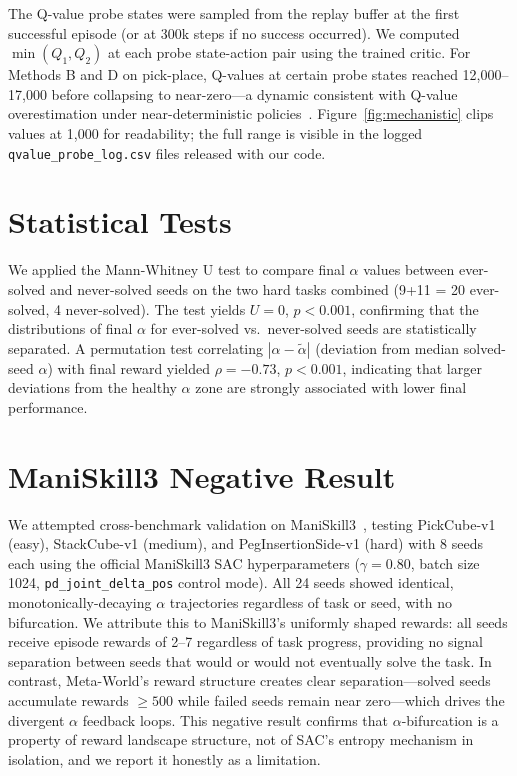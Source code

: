 \documentclass[twocolumn]{article}
\begin{document}
The Q-value probe states were sampled from the replay buffer at the first
successful episode (or at 300k steps if no success occurred). We computed
$\min(Q_1, Q_2)$ at each probe state-action pair using the trained critic.
For Methods B and D on pick-place, Q-values at certain probe states reached
12,000--17,000 before collapsing to near-zero---a dynamic consistent with
Q-value overestimation under near-deterministic policies~\citep{fujimoto2018}.
Figure~\ref{fig:mechanistic} clips values at 1,000 for readability; the full
range is visible in the logged \texttt{qvalue\_probe\_log.csv} files released
with our code.


\section{Statistical Tests}
\label{app:stats}

We applied the Mann-Whitney U test to compare final $\alpha$ values between
ever-solved and never-solved seeds on the two hard tasks combined (9+11 = 20
ever-solved, 4 never-solved). The test yields $U = 0$, $p < 0.001$, confirming
that the distributions of final $\alpha$ for ever-solved vs.\ never-solved seeds are
statistically separated. A permutation test correlating $|\alpha - \tilde{\alpha}|$
(deviation from median solved-seed $\alpha$) with final reward yielded
$\rho = -0.73$, $p < 0.001$, indicating that larger deviations from the
healthy $\alpha$ zone are strongly associated with lower final performance.


\section{ManiSkill3 Negative Result}
\label{app:maniskill}

We attempted cross-benchmark validation on ManiSkill3~\citep{gu2023maniskill2},
testing PickCube-v1 (easy), StackCube-v1 (medium), and PegInsertionSide-v1
(hard) with 8 seeds each using the official ManiSkill3 SAC hyperparameters
($\gamma = 0.80$, batch size 1024, \texttt{pd\_joint\_delta\_pos} control mode).
All 24 seeds showed identical, monotonically-decaying $\alpha$ trajectories
regardless of task or seed, with no bifurcation. We attribute this to
ManiSkill3's uniformly shaped rewards: all seeds receive episode rewards of
2--7 regardless of task progress, providing no signal separation between seeds
that would or would not eventually solve the task. In contrast, Meta-World's
reward structure creates clear separation---solved seeds accumulate rewards
$\geq 500$ while failed seeds remain near zero---which drives the divergent
$\alpha$ feedback loops. This negative result confirms that $\alpha$-bifurcation
is a property of reward landscape structure, not of SAC's entropy mechanism
in isolation, and we report it honestly as a limitation.
\end{document}
